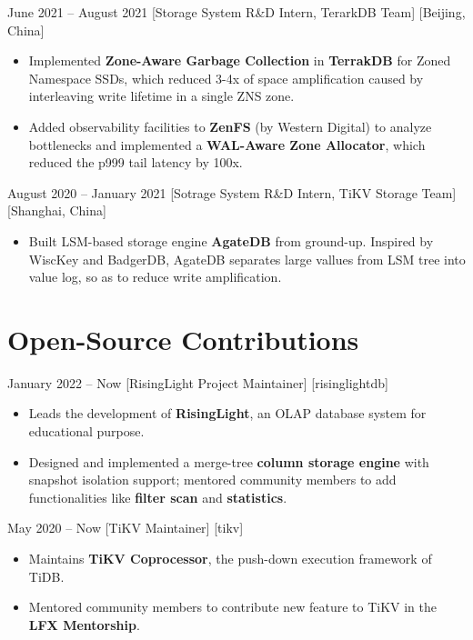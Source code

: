 \documentclass{chicv}
\begin{document}
  {June 2021 – August 2021}
  [Storage System R\&D Intern, TerarkDB Team]
  [Beijing, China]

\begin{itemize}
  \item Implemented \textbf{Zone-Aware Garbage Collection} in \textbf{TerrakDB} for Zoned Namespace SSDs, which reduced 3-4x of space amplification caused by interleaving write lifetime in a single ZNS zone. %
  \item Added observability facilities to \textbf{ZenFS} (by Western Digital) to analyze bottlenecks and implemented a \textbf{WAL-Aware Zone Allocator}, which reduced the p999 tail latency by 100x. %
\end{itemize}

  {August 2020 -- January 2021}
  [Sotrage System R\&D Intern, TiKV Storage Team][Shanghai, China]
  \begin{itemize}
    \item Built LSM-based storage engine \textbf{AgateDB} from ground-up. Inspired by WiscKey and BadgerDB, AgateDB separates large vallues from LSM tree into value log, so as to reduce write amplification.
  \end{itemize}

\section{Open-Source Contributions}

  {January 2022 -- Now}
  [RisingLight Project Maintainer]
  [risinglightdb] %
  \begin{itemize}
    \item Leads the development of \textbf{RisingLight}, an OLAP database system for educational purpose.
    \item Designed and implemented a merge-tree \textbf{column storage engine} with snapshot isolation support; mentored community members to add functionalities like \textbf{filter scan} and \textbf{statistics}.
  \end{itemize}

    {May 2020 -- Now}
    [TiKV Maintainer]
    [tikv] %
    \begin{itemize}
      \item Maintains \textbf{TiKV Coprocessor}, the push-down execution framework of TiDB.
      \item Mentored community members to contribute new feature to TiKV in the \textbf{LFX Mentorship}. %
    \end{itemize}
\end{document}
